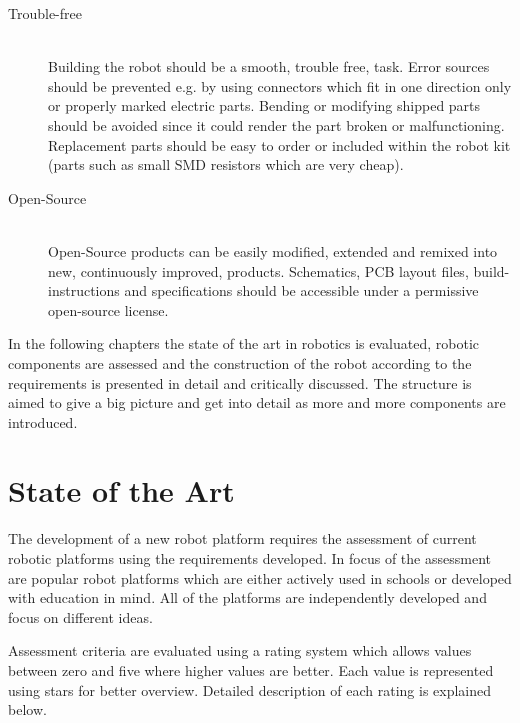 \begin{description}
\item[Trouble-free] \hfill \\ Building the robot should be a smooth, trouble free, task. Error sources should be prevented e.g. by using connectors which fit in one direction only or properly marked electric parts. Bending or modifying shipped parts should be avoided since it  could render the part broken or malfunctioning. Replacement parts should be easy to order or included within the robot kit (parts such as small SMD resistors which are very cheap).
\item[Open-Source] \hfill \\ Open-Source products can be easily modified, extended and remixed into new, continuously improved, products. Schematics, PCB layout files, build-instructions and specifications should be accessible under a permissive open-source license. 
\end{description}

In the following chapters the state of the art in robotics is evaluated, robotic components are assessed and the construction of the robot according to the requirements is presented in detail and critically discussed. The structure is aimed to give a big picture and get into detail as more and more components are introduced.
\chapter{State of the Art}
The development of a new robot platform requires the assessment of current robotic platforms using the requirements developed. In focus of the assessment are popular robot platforms which are either actively used in schools or developed with education in mind. All of the platforms are independently developed and focus on different ideas. 

Assessment criteria are evaluated using a rating system which allows values between zero and five where higher values are better. Each value is represented using stars for better overview. Detailed description of each rating is explained below.

